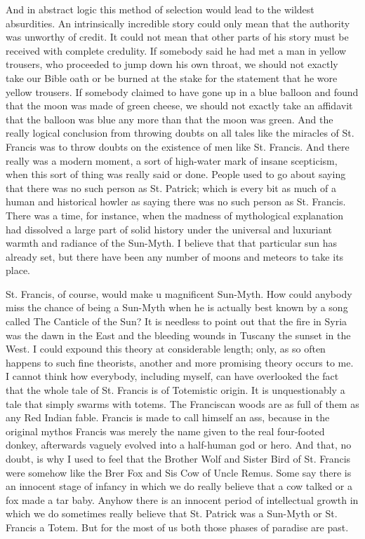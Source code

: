\documentclass{book}
\begin{document}
And in abstract logic this method of selection would lead to the wildest absurdities. An intrinsically incredible story could only mean that the authority was unworthy of credit. It could not mean that other parts of his story must be received with complete credulity. If somebody said he had met a man in yellow trousers, who proceeded to jump down his own throat, we should not exactly take our Bible oath or be burned at the stake for the statement that he wore yellow trousers. If somebody claimed to have gone up in a blue balloon and found that the moon was made of green cheese, we should not exactly take an affidavit that the balloon was blue any more than that the moon was green. And the really logical conclusion from throwing doubts on all tales like the miracles of St. Francis was to throw doubts on the existence of men like St. Francis. And there really was a modern moment, a sort of high-water mark of insane scepticism, when this sort of thing was really said or done. People used to go about saying that there was no such person as St. Patrick; which is every bit as much of a human and historical howler as saying there was no such person as St. Francis. There was a time, for instance, when the madness of mythological explanation had dissolved a large part of solid history under the universal and luxuriant warmth and radiance of the Sun-Myth. I believe that that particular sun has already set, but there have been any number of moons and meteors to take its place.

St. Francis, of course, would make u magnificent Sun-Myth. How could anybody miss the chance of being a Sun-Myth when he is actually best known by a song called The Canticle of the Sun? It is needless to point out that the fire in Syria was the dawn in the East and the bleeding wounds in Tuscany the sunset in the West. I could expound this theory at considerable length; only, as so often happens to such fine theorists, another and more promising theory occurs to me. I cannot think how everybody, including myself, can have overlooked the fact that the whole tale of St. Francis is of Totemistic origin. It is unquestionably a tale that simply swarms with totems. The Franciscan woods are as full of them as any Red Indian fable. Francis is made to call himself an ass, because in the original mythos Francis was merely the name given to the real four-footed donkey, afterwards vaguely evolved into a half-human god or hero. And that, no doubt, is why I used to feel that the Brother Wolf and Sister Bird of St. Francis were somehow like the Brer Fox and Sis Cow of Uncle Remus. Some say there is an innocent stage of infancy in which we do really believe that a cow talked or a fox made a tar baby. Anyhow there is an innocent period of intellectual growth in which we do sometimes really believe that St. Patrick was a Sun-Myth or St. Francis a Totem. But for the most of us both those phases of paradise are past.
\end{document}

